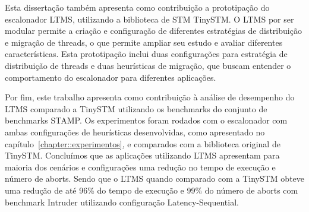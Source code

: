 \documentclass[diss,capa]{texufpel}
\begin{document}

Esta dissertação também apresenta como contribuição a prototipação do escalonador LTMS, utilizando a biblioteca de STM TinySTM. O LTMS por ser modular permite a criação e configuração de diferentes estratégias de distribuição e migração de threads, o que permite ampliar seu estudo e avaliar diferentes características. Esta prototipação inclui duas configurações para estratégia de distribuição de threads e duas heurísticas de migração, que buscam entender o comportamento do escalonador para diferentes aplicações.

Por fim, este trabalho apresenta como contribuição à análise de desempenho do LTMS comparado a TinySTM utilizando os benchmarks do conjunto de benchmarks STAMP. Os experimentos foram rodados com o escalonador com ambas configurações de heurísticas desenvolvidas, como apresentado no capítulo~\ref{chapter::experimentos}, e comparados com a biblioteca original de TinySTM. Concluímos que as aplicações utilizando LTMS apresentam para maioria dos cenários e configurações uma redução no tempo de execução e número de aborts. Sendo que o LTMS quando comparado com a TinySTM obteve uma redução de até 96\% do tempo de execução e 99\% do número de aborts com benchmark Intruder utilizando configuração Latency-Sequential.
\end{document}
